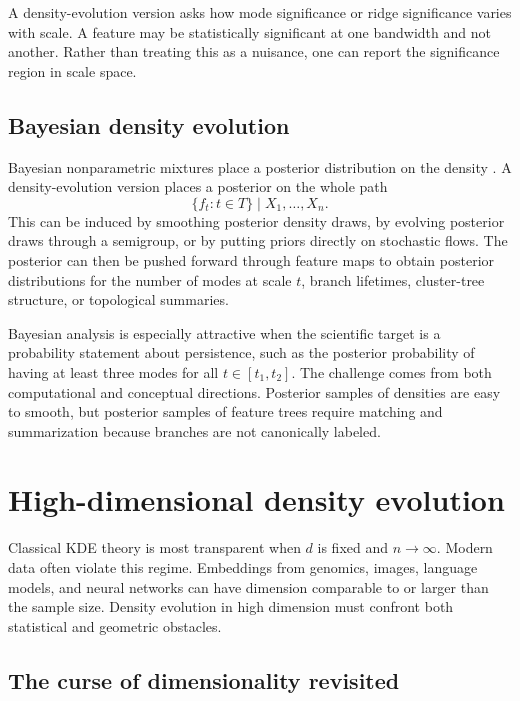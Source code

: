 \documentclass[preprint]{imsart}
\theoremstyle{plain}
\theoremstyle{definition}
\begin{document}
A density-evolution version asks how mode significance or ridge significance varies with scale. A feature may be statistically significant at one bandwidth and not another. Rather than treating this as a nuisance, one can report the significance region in scale space.

\subsection{Bayesian density evolution}
\label{subsec:bayesian-paths}

Bayesian nonparametric mixtures place a posterior distribution on the density \citep{ferguson_1973_BayesianAnalysisNonparametric,lo_1984_ClassBayesianNonparametric,escobar_1995_BayesianDensityEstimation}. A density-evolution version places a posterior on the whole path
\[
  \{f_t:t\in T\}\mid X_1,\ldots,X_n.
\]
This can be induced by smoothing posterior density draws, by evolving posterior draws through a semigroup, or by putting priors directly on stochastic flows. The posterior can then be pushed forward through feature maps to obtain posterior distributions for the number of modes at scale $t$, branch lifetimes, cluster-tree structure, or topological summaries.

Bayesian analysis is especially attractive when the scientific target is a probability statement about persistence, such as the posterior probability of having at least three modes for all $t\in[t_1,t_2]$. The challenge comes from both computational and conceptual directions.  Posterior samples of densities are easy to smooth, but posterior samples of feature trees require matching and summarization because branches are not canonically labeled.


\section{High-dimensional density evolution}
\label{sec:high-dimensional}

Classical KDE theory is most transparent when $d$ is fixed and $n\to\infty$. Modern data often violate this regime. Embeddings from genomics, images, language models, and neural networks can have dimension comparable to or larger than the sample size. Density evolution in high dimension must confront both statistical and geometric obstacles.

\subsection{The curse of dimensionality revisited}
\label{subsec:curse}
\end{document}
